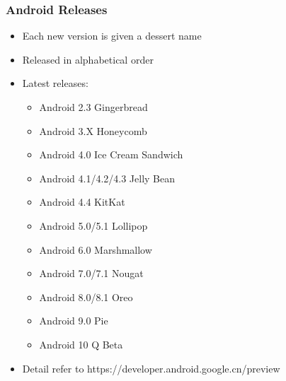 \begin{frame}
  \frametitle{Android Releases}
  \begin{itemize}
  \item Each new version is given a dessert name
  \item Released in alphabetical order
  \item Latest releases:
    \begin{itemize}
    \item Android 2.3 Gingerbread
    \item Android 3.X Honeycomb
    \item Android 4.0 Ice Cream Sandwich
    \item Android 4.1/4.2/4.3 Jelly Bean
    \item Android 4.4 KitKat
	\item Android 5.0/5.1 Lollipop
	\item Android 6.0 Marshmallow
	\item Android 7.0/7.1 Nougat
	\item Android 8.0/8.1 Oreo
	\item Android 9.0 Pie
	\item Android 10 Q Beta
    \end{itemize}
  \item Detail refer to https://developer.android.google.cn/preview
  \end{itemize}
\end{frame}

